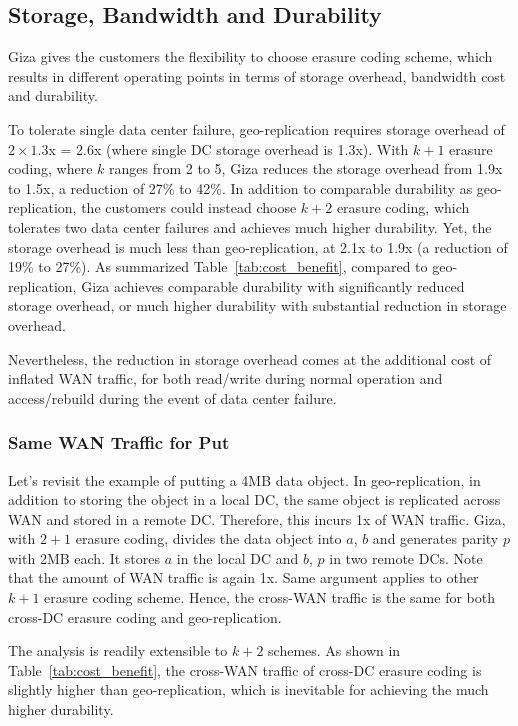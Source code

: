 \subsection{Storage, Bandwidth and Durability}

Giza gives the customers the flexibility to choose erasure coding scheme, which results in different operating points in terms of storage overhead, bandwidth cost and durability. 

To tolerate single data center failure, geo-replication requires storage overhead of $2\times1.3$x = 2.6x (where single DC storage overhead is 1.3x). With $k+1$ erasure coding, where $k$ ranges from 2 to 5, Giza reduces the storage overhead from 1.9x to 1.5x, a reduction of 27\% to 42\%. In addition to comparable durability as geo-replication, the customers could instead choose $k+2$ erasure coding, which tolerates two data center failures and achieves much higher durability. Yet, the storage overhead is much less than geo-replication, at 2.1x to 1.9x (a reduction of 19\% to 27\%). As summarized Table~\ref{tab:cost_benefit}, compared to geo-replication, Giza achieves comparable durability with significantly reduced storage overhead, or much higher durability with substantial reduction in storage overhead.

Nevertheless, the reduction in storage overhead comes at the additional cost of inflated WAN traffic, for both read/write during normal operation and access/rebuild during the event of data center failure. 

\subsubsection{Same WAN Traffic for Put}

Let's revisit the example of putting a 4MB data object. In geo-replication, in addition to storing the object in a local DC, the same object is replicated across WAN and stored in a remote DC. Therefore, this incurs 1x of WAN traffic. Giza, with $2 + 1$ erasure coding, divides the data object into $a$, $b$ and generates parity $p$ with 2MB each. It stores $a$ in the local DC and $b$, $p$ in two remote DCs. Note that the amount of WAN traffic is again 1x. Same argument applies to other $k+1$ erasure coding scheme. Hence, the cross-WAN traffic is the same for both cross-DC erasure coding and geo-replication.

The analysis is readily extensible to $k+2$ schemes. As shown in Table~\ref{tab:cost_benefit}, the cross-WAN traffic of cross-DC erasure coding is slightly higher than geo-replication, which is inevitable for achieving the much higher durability.


